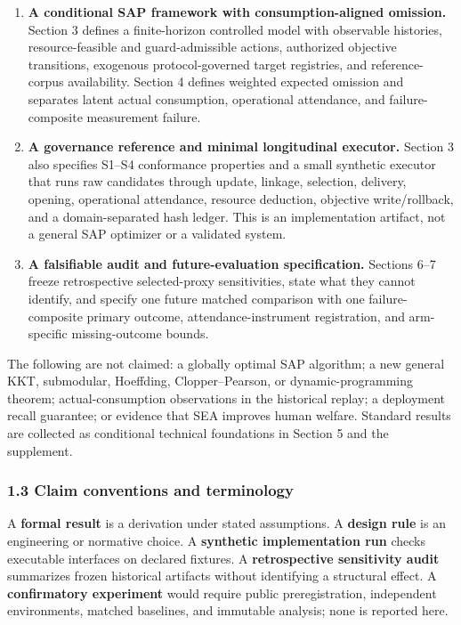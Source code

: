\documentclass[
  11pt]{article}
\providecommand{\tightlist}{%
  \setlength{\itemsep}{0pt}\setlength{\parskip}{0pt}}
\begin{document}
\begin{enumerate}
\def\labelenumi{\arabic{enumi}.}
\tightlist
\item
  \textbf{A conditional SAP framework with consumption-aligned
  omission.} Section 3 defines a finite-horizon controlled model with
  observable histories, resource-feasible and guard-admissible actions,
  authorized objective transitions, exogenous protocol-governed target
  registries, and reference-corpus availability. Section 4 defines
  weighted expected omission and separates latent actual consumption,
  operational attendance, and failure-composite measurement failure.
\item
  \textbf{A governance reference and minimal longitudinal executor.}
  Section 3 also specifies S1--S4 conformance properties and a small
  synthetic executor that runs raw candidates through update, linkage,
  selection, delivery, opening, operational attendance, resource
  deduction, objective write/rollback, and a domain-separated hash
  ledger. This is an implementation artifact, not a general SAP
  optimizer or a validated system.
\item
  \textbf{A falsifiable audit and future-evaluation specification.}
  Sections 6--7 freeze retrospective selected-proxy sensitivities, state
  what they cannot identify, and specify one future matched comparison
  with one failure-composite primary outcome, attendance-instrument
  registration, and arm-specific missing-outcome bounds.
\end{enumerate}

The following are not claimed: a globally optimal SAP algorithm; a new
general KKT, submodular, Hoeffding, Clopper--Pearson, or
dynamic-programming theorem; actual-consumption observations in the
historical replay; a deployment recall guarantee; or evidence that SEA
improves human welfare. Standard results are collected as conditional
technical foundations in Section 5 and the supplement.

\subsubsection{1.3 Claim conventions and
terminology}\label{claim-conventions-and-terminology}

A \textbf{formal result} is a derivation under stated assumptions. A
\textbf{design rule} is an engineering or normative choice. A
\textbf{synthetic implementation run} checks executable interfaces on
declared fixtures. A \textbf{retrospective sensitivity audit} summarizes
frozen historical artifacts without identifying a structural effect. A
\textbf{confirmatory experiment} would require public preregistration,
independent environments, matched baselines, and immutable analysis;
none is reported here.
\end{document}
